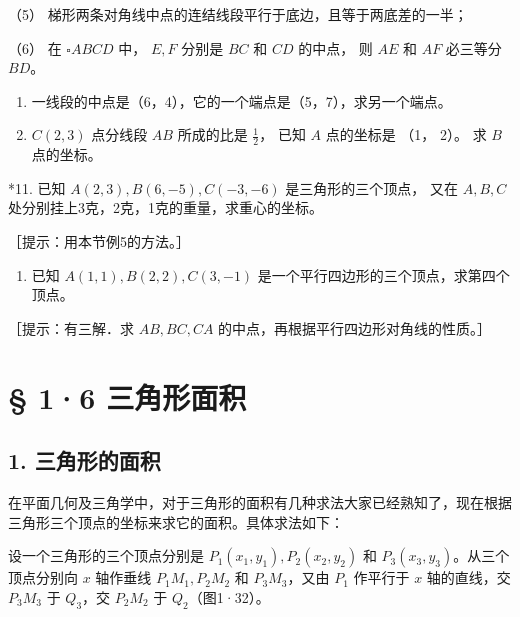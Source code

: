 （5） 梯形两条对角线中点的连结线段平行于底边，且等于两底差的一半；

（6） 在 \(\square ABCD\) 中， \(E, F\) 分别是 \(BC\) 和 \(CD\) 的中点，
则 \(AE\) 和 \(AF\) 必三等分 \(BD\)。

\begin{enumerate}
\def\labelenumi{\arabic{enumi}.}
\setcounter{enumi}{8}
\item
  一线段的中点是（6，4），它的一个端点是（5，7），求另一个端点。
\item
  \(C(2,3)\) 点分线段 \(AB\) 所成的比是 \(\frac{1}{2}\)， 已知 \(A\)
  点的坐标是 （1， 2）。 求 \(B\) 点的坐标。
\end{enumerate}

*11. 已知 \(A(2,3), B(6,-5), C(-3,-6)\) 是三角形的三个顶点， 又在
\(A, B, C\) 处分别挂上3克，2克，1克的重量，求重心的坐标。

［提示：用本节例5的方法。］

\begin{enumerate}
\def\labelenumi{\arabic{enumi}.}
\setcounter{enumi}{11}
\tightlist
\item
  已知 \(A(1, 1), B(2, 2), C(3, -1)\)
  是一个平行四边形的三个顶点，求第四个顶点。
\end{enumerate}

［提示：有三解．求 \(AB, BC, CA\)
的中点，再根据平行四边形对角线的性质。］

\section{§ 1·6 三角形面积}\label{ux4e09ux89d2ux5f62ux9762ux79ef}

\subsection{1. 三角形的面积}\label{ux4e09ux89d2ux5f62ux7684ux9762ux79ef}

在平面几何及三角学中，对于三角形的面积有几种求法大家已经熟知了，现在根据三角形三个顶点的坐标来求它的面积。具体求法如下：

设一个三角形的三个顶点分别是 \(P_{1}(x_{1},y_{1}), P_{2}(x_{2},y_{2})\)
和 \(P_{3}(x_{3},y_{3})\)。从三个顶点分别向 \(x\) 轴作垂线
\(P_{1}M_{1}, P_{2}M_{2}\) 和 \(P_{3}M_{3}\)，又由 \(P_{1}\) 作平行于
\(x\) 轴的直线，交 \(P_{3}M_{3}\) 于 \(Q_{3}\)，交 \(P_{2}M_{2}\) 于
\(Q_{2}\)（图1·32）。

